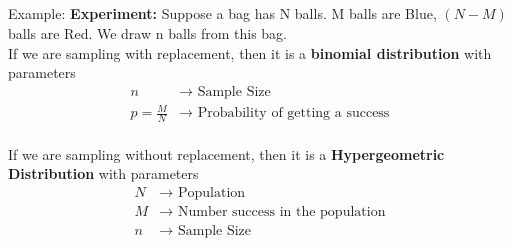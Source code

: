 \documentclass[11pt,oneside]{book}
\theoremstyle{break}
\theoremstyle{break}
\newcommand{\example}{\color{WildStrawberry}Example: \color{black}}
\begin{document}
\hfill\\
\hfill\\
\hfill\\
\hfill\\
\example 
\textbf{Experiment:} Suppose a bag has N balls. M balls are Blue, $(N-M)$ balls are Red. We draw n balls from this bag.\\
If we are sampling with replacement, then it is a \textbf{binomial distribution} with parameters \begin{align*}
n &\rightarrow \text{ Sample Size}\\
p=\frac{M}{N}&\rightarrow \text{ Probability of getting a success}
\end{align*}
\hfill\\
If we are sampling without replacement, then it is a \textbf{Hypergeometric Distribution} with parameters \begin{align*}
N &\rightarrow \text{ Population}\\
M &\rightarrow \text{ Number success in the population}\\
n &\rightarrow \text{ Sample Size}
\end{align*}
\end{document}
